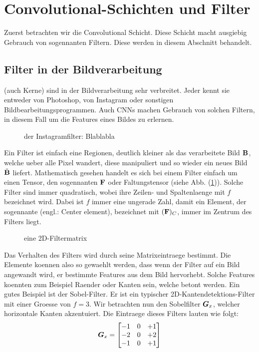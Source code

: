 \section{Convolutional-Schichten und Filter}
Zuerst betrachten wir die Convolutional Schicht. Diese Schicht macht ausgiebig
Gebrauch von sogennanten Filtern. Diese werden in diesem Abschnitt behandelt.

\subsection{Filter in der Bildverarbeitung}
 (auch Kerne) sind in der Bildverarbeitung sehr verbreitet. Jeder kennt sie entweder
von Photoshop, von Instagram oder sonstigen Bildbearbeitungsprogrammen.
Auch CNNs machen Gebrauch von solchen Filtern, in diesem Fall um die Features eines Bildes zu
erlernen.
\begin{figure}[h!]

  \caption{der Instagramfilter: Blablabla}
\end{figure}

\para{}
Ein Filter ist einfach eine Regionen, deutlich kleiner als das verarbeitete Bild
$\mathbf{B}$, welche
ueber alle Pixel wandert, diese manipuliert und so wieder ein neues Bild
$\tilde{\mathbf{B}}$ liefert.
Mathematisch gesehen handelt es sich bei einem Filter einfach um einen Tensor,
den sogennanten  $\mathbf{F}$ oder Faltungstensor (siehe Abb.
(\ref{fig:filtermatrix})). Solche Filter sind immer quadratisch, wobei ihre
Zeilen- und Spaltenlaenge mit $f$ bezeichnet wird. Dabei ist $f$ immer eine ungerade Zahl, damit ein
Element, der sogennante  (engl.: Center element), bezeichnet mit $(\mathbf{F})_C$,
immer im Zentrum des Filters liegt. \\

\begin{figure}[h!]
  \caption{eine 2D-Filtermatrix}
  \label{fig:filtermatrix}
\end{figure}
\para{}
Das Verhalten des Filters wird durch seine Matrixeintraege bestimmt.
Die Elemente koennen also so gewaehlt werden, dass wenn der Filter auf ein Bild
angewandt wird, er bestimmte Features aus dem Bild hervorhebt. Solche Features
koennten zum Beispiel Raender oder Kanten sein, welche betont werden.
\para{}
Ein gutes Beispiel ist der Sobel-Filter. Er ist ein typischer 2D-Kantendetektions-Filter mit einer
Groesse von $f = 3$. Wir betrachten nun den Sobelfilter $\bm{G}_x$, welcher
horizontale Kanten akzentuiert. Die Eintraege dieses Filters lauten wie folgt:
\begin{equation*}
  \bm{G}_x =
  \begin{bmatrix}
    -1 & 0 & +1 \\
    -2 & 0 & +2 \\
    -1 & 0 & +1 \\
  \end{bmatrix}
\end{equation*}

